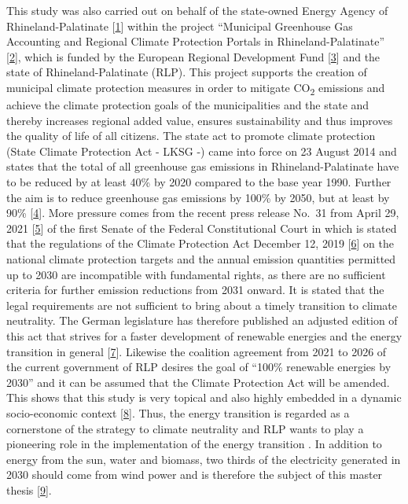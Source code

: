 \documentclass[a4paper,11pt]{article}
\begin{document}
This study was also carried out on behalf of the state-owned Energy Agency of Rhineland-Palatinate {[}\protect\hyperlink{ref-EnergieagenturRheinlandPfalz.2021}{1}{]} within the project ``Municipal Greenhouse Gas Accounting and Regional Climate Protection Portals in Rhineland-Palatinate'' {[}\protect\hyperlink{ref-KomBiReK.2021}{2}{]}, which is funded by the European Regional Development Fund {[}\protect\hyperlink{ref-EuropeanRegionalDevelopmentFund.2021}{3}{]} and the state of Rhineland-Palatinate (RLP). This project supports the creation of municipal climate protection measures in order to mitigate CO\textsubscript{2} emissions and achieve the climate protection goals of the municipalities and the state and thereby increases regional added value, ensures sustainability and thus improves the quality of life of all citizens. The state act to promote climate protection (State Climate Protection Act - LKSG -) came into force on 23 August 2014 and states that the total of all greenhouse gas emissions in Rhineland-Palatinate have to be reduced by at least 40\% by 2020 compared to the base year 1990. Further the aim is to reduce greenhouse gas emissions by 100\% by 2050, but at least by 90\% {[}\protect\hyperlink{ref-RheinlandPfalz.19.08.2014}{4}{]}. More pressure comes from the recent press release No.~31 from April 29, 2021 {[}\protect\hyperlink{ref-Bundesverfassungsgericht.24.03.2021}{5}{]} of the first Senate of the Federal Constitutional Court in which is stated that the regulations of the Climate Protection Act December 12, 2019 {[}\protect\hyperlink{ref-BundesamtfurJustiz.2019}{6}{]} on the national climate protection targets and the annual emission quantities permitted up to 2030 are incompatible with fundamental rights, as there are no sufficient criteria for further emission reductions from 2031 onward. It is stated that the legal requirements are not sufficient to bring about a timely transition to climate neutrality. The German legislature has therefore published an adjusted edition of this act that strives for a faster development of renewable energies and the energy transition in general {[}\protect\hyperlink{ref-BundesministeriumfurUmweltNaturschutzundnukleareSicherheit.12.05.2021}{7}{]}. Likewise the coalition agreement from 2021 to 2026 of the current government of RLP desires the goal of ``100\% renewable energies by 2030'' and it can be assumed that the Climate Protection Act will be amended. This shows that this study is very topical and also highly embedded in a dynamic socio-economic context {[}\protect\hyperlink{ref-SPDGruneFDP.2021}{8}{]}. Thus, the energy transition is regarded as a cornerstone of the strategy to climate neutrality and RLP wants to play a pioneering role in the implementation of the energy transition . In addition to energy from the sun, water and biomass, two thirds of the electricity generated in 2030 should come from wind power and is therefore the subject of this master thesis {[}\protect\hyperlink{ref-LandesregierungRheinlandPfalz.2021}{9}{]}.
\end{document}
